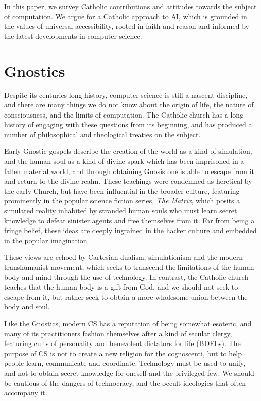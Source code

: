 \documentclass[sigplan,nonacm]{acmart}\settopmatter{printfolios=false,printccs=false,printacmref=false}
\begin{document}
  In this paper, we survey Catholic contributions and attitudes towards the subject of computation. We argue for a Catholic approach to AI, which is grounded in the values of universal accessibility, rooted in faith and reason and informed by the latest developments in computer science.

 \section{Gnostics}

  Despite its centuries-long history, computer science is still a nascent discipline, and there are many things we do not know about the origin of life, the nature of consciousness, and the limits of computation. The Catholic church has a long history of engaging with these questions from its beginning, and has produced a number of philosophical and theological treaties on the subject.

  Early Gnostic gospels describe the creation of the world as a kind of simulation, and the human soul as a kind of divine spark which has been imprisoned in a fallen material world, and through obtaining Gnosis one is able to escape from it and return to the divine realm. These teachings were condemned as heretical by the early Church, but have been influential in the broader culture, featuring prominently in the popular science fiction series, \textit{The Matrix}, which posits a simulated reality inhabited by stranded human souls who must learn secret knowledge to defeat sinister agents and free themselves from it. Far from being a fringe belief, these ideas are deeply ingrained in the hacker culture and embedded in the popular imagination.

  These views are echoed by Cartesian dualism, simulationism and the modern transhumanist movement, which seeks to transcend the limitations of the human body and mind through the use of technology. In contrast, the Catholic church teaches that the human body is a gift from God, and we should not seek to escape from it, but rather seek to obtain a more wholesome union between the body and soul.

  Like the Gnostics, modern CS has a reputation of being somewhat esoteric, and many of its practitioners fashion themselves after a kind of secular clergy, featuring cults of personality and benevolent dictators for life (BDFLs). The purpose of CS is not to create a new religion for the cognoscenti, but to help people learn, communicate and coordinate. Technology must be used to unify, and not to obtain secret knowledge for oneself and the privileged few. We should be cautious of the dangers of technocracy, and the occult ideologies that often accompany it.
\end{document}
